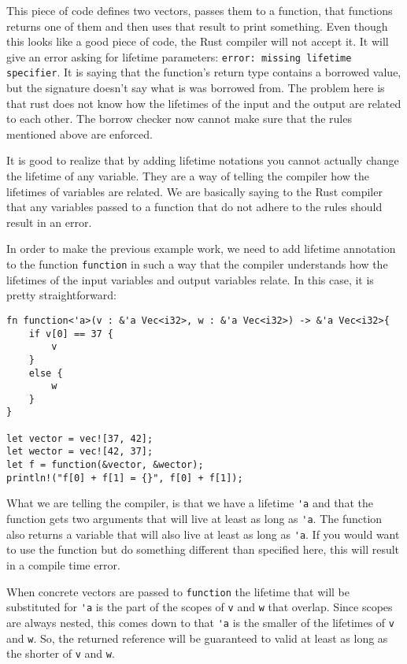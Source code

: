 This piece of code defines two vectors, passes them to a function, that functions returns one of them and then uses that result to print something. Even though this looks like a good piece of code, the Rust compiler will not accept it. It will give an error asking for lifetime parameters: \verb|error: missing lifetime specifier|. It is saying that the function's return type contains a borrowed value, but the signature doesn't say what is was borrowed from. The problem here is that rust does not know how the lifetimes of the input and the output are related to each other. The borrow checker now cannot make sure that the rules mentioned above are enforced. 

It is good to realize that by adding lifetime notations you cannot actually change the lifetime of any variable. They are a way of telling the compiler how the lifetimes of variables are related. We are basically saying to the Rust compiler that any variables passed to a function that do not adhere to the rules should result in an error. 

In order to make the previous example work, we need to add lifetime annotation to the function \verb|function| in such a way that the compiler understands how the lifetimes of the input variables and output variables relate. In this case, it is pretty straightforward: 

\begin{verbatim}
fn function<'a>(v : &'a Vec<i32>, w : &'a Vec<i32>) -> &'a Vec<i32>{
    if v[0] == 37 {
        v
    }
    else {
        w
    }
}

let vector = vec![37, 42];
let wector = vec![42, 37];
let f = function(&vector, &wector);
println!("f[0] + f[1] = {}", f[0] + f[1]);
\end{verbatim}

What we are telling the compiler, is that we have a lifetime \verb|'a| and that the function gets two arguments that will live at least as long as \verb|'a|. The function also returns a variable that will also live at least as long as \verb|'a|. If you would want to use the function but do something different than specified here, this will result in a compile time error. 

When concrete vectors are passed to \verb|function| the lifetime that will be substituted for \verb|'a| is the part of the scopes of \verb|v| and \verb|w| that overlap. Since scopes are always nested, this comes down to that \verb|'a| is the smaller of the lifetimes of \verb|v| and \verb|w|. So, the returned reference will be guaranteed to valid at least as long as the shorter of \verb|v| and \verb|w|.

